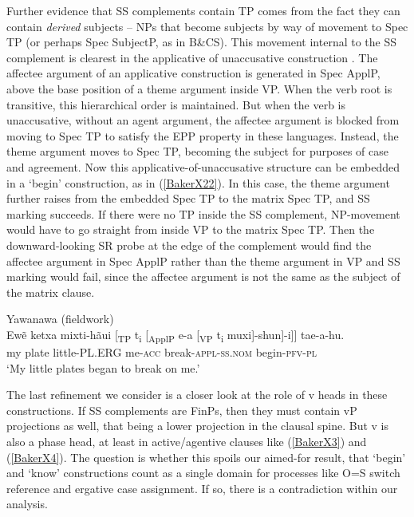 \documentclass[output=paper]{langscibook}
\begin{document}
Further evidence that SS complements contain TP comes from the fact they can contain \textit{derived} subjects – NPs that become subjects by way of movement to Spec TP (or perhaps Spec SubjectP, as in B\&CS). This movement internal to the SS complement is clearest in the applicative of unaccusative construction \citep[see][]{baker2014dependent}. The affectee argument of an applicative construction is generated in Spec ApplP, above the base position of a theme argument inside VP. When the verb root is transitive, this hierarchical order is maintained. But when the verb is unaccusative, without an agent argument, the affectee argument is blocked from moving to Spec TP to satisfy the EPP property in these languages. Instead, the theme argument moves to Spec TP, becoming the subject for purposes of case and agreement. Now this applicative-of-unaccusative structure can be embedded in a `begin’ construction, as in (\ref{BakerX22}). In this case, the theme argument further raises from the embedded Spec TP to the matrix Spec TP, and SS marking succeeds. If there were no TP inside the SS complement, NP-movement would have to go straight from inside VP to the matrix Spec TP. Then the downward-looking SR probe at the edge of the complement would find the affectee argument in Spec ApplP rather than the theme argument in VP and SS marking would fail, since the affectee argument is not the same as the subject of the matrix clause.\largerpage[2]

\begin{exe}
    \ex Yawanawa (fieldwork) \label{BakerX22}\\
	\gll Ewẽ ketxa {mixti-hãui [\textsubscript{TP} t\textsubscript{i}} [\textsubscript{ApplP} e-a [\textsubscript{VP} t\textsubscript{i} muxi]-shun]-i]] tae-a-hu.\\
    my plate little-\textsc{PL.ERG} {} me-\textsc{acc} {} {} break-\textsc{appl-ss.nom} begin-\textsc{pfv-pl}\\
	\glt `My little plates began to break on me.'
\end{exe}

The last refinement we consider is a closer look at the role of v heads in these constructions. If SS complements are FinPs, then they must contain vP projections as well, that being a lower projection in the clausal spine. But v is also a phase head, at least in active/agentive clauses like (\ref{BakerX3}) and (\ref{BakerX4}). The question is whether this spoils our aimed-for result, that ‘begin’ and ‘know’ constructions count as a single domain for processes like O=S switch reference and ergative case assignment. If so, there is a contradiction within our analysis.
\end{document}

